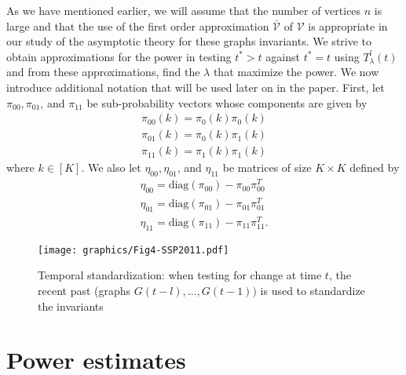 \documentclass[10pt,journal,compsoc]{IEEEtran}
\theoremstyle{definition}
\begin{document}
As we have mentioned earlier, we will assume that the number of
vertices $n$ is large and that the use of the first order
approximation $\bar{\mathscr{V}}$ of $\mathscr{V}$ is appropriate in
our study of the asymptotic theory for these graphs invariants. We
strive to obtain approximations for the power in testing $t^{*} > t$
against $t^{*} = t$ using $T_{\lambda}^{l}(t)$ and from these
approximations, find the $\lambda$ that maximize the power. We now
introduce additional notation that will be used later on in the
paper. First, let $\pi_{00}, \pi_{01}$, and $\pi_{11}$ be
sub-probability vectors whose components are given by
\begin{gather*}
  \pi_{00}(k) = \pi_{0}(k) \pi_{0}(k) \\
  \pi_{01}(k) = \pi_{0}(k) \pi_{1}(k) \\
  \pi_{11}(k) = \pi_{1}(k) \pi_{1}(k)
\end{gather*}
where $k \in [K]$. We also let $\eta_{00}, \eta_{01}$, and
$\eta_{11}$ be matrices of size $K \times K$ defined by 
\begin{gather*}
  \eta_{00} = \mathrm{diag}(\pi_{00}) - \pi_{00} \pi_{00}^{T} \\
  \eta_{01} = \mathrm{diag}(\pi_{01}) - \pi_{01} \pi_{01}^{T} \\
  \eta_{11} = \mathrm{diag}(\pi_{11}) - \pi_{11} \pi_{11}^{T}.
\end{gather*}
\begin{figure}[htbp]
  \centering
  \texttt{[image: graphics/Fig4-SSP2011.pdf]}
  \caption{Temporal standardization: when testing for change at time
    $t$, the recent past (graphs $G(t - l), \dots, G(t-1))$ is used to
    standardize the invariants}
  \label{fig:temporal}
\end{figure}
\section{Power estimates}
\end{document}
